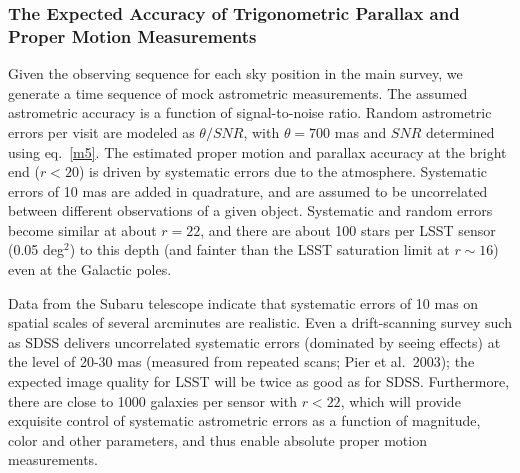 \documentclass{emulateapj}
\begin{document}
\subsubsection{The Expected Accuracy of Trigonometric Parallax and Proper Motion Measurements } 
\label{sec:astrom}

Given the observing sequence for each sky position in the main survey, we
generate a time sequence of mock astrometric measurements. The assumed astrometric 
accuracy is a function of signal-to-noise ratio. Random astrometric errors per
visit are modeled as $\theta/SNR$, with $\theta=700$ mas and $SNR$ determined using
eq.~\ref{m5}. The estimated proper motion and parallax accuracy at the bright end
($r<20$) is driven by systematic errors due to the atmosphere. Systematic
errors of 10 mas are added in quadrature, and are assumed to be {uncorrelated} 
between different observations of a given object. Systematic and random
errors become similar at about $r=22$, and there are about 100 stars per LSST 
sensor (0.05 deg$^2$) to this depth (and fainter than the LSST saturation limit at
$r\sim16$) even at the Galactic poles. 

Data from the Subaru telescope indicate that systematic errors of 
10 mas on spatial scales of several arcminutes are realistic. Even a drift-scanning 
survey such as SDSS delivers uncorrelated systematic errors (dominated by seeing 
effects) at the level of 20-30 mas (measured from repeated scans; Pier et al.~2003);
the expected image quality for LSST will be twice as good as for SDSS. Furthermore, 
there are close to 1000 galaxies per sensor with $r<22$, which will provide exquisite 
control of systematic astrometric errors as a function of magnitude, color and other 
parameters, and thus enable absolute proper motion measurements.
\end{document}
